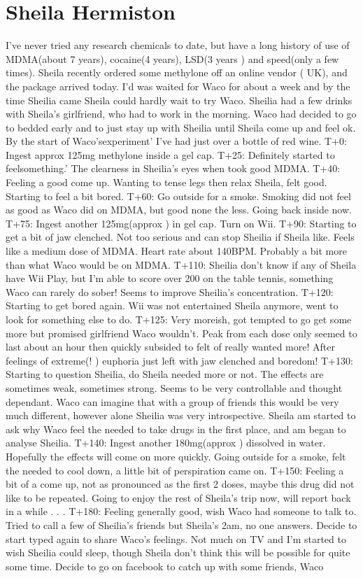 \documentclass[12pt]{book}
\begin{document}
\chapter{Sheila Hermiston}

I've never tried any research chemicals to date, but have a long history of use of MDMA(about 7 years), cocaine(4 years), LSD(3 years ) and speed(only a few times). Sheila recently ordered some methylone off an online vendor ( UK), and the package arrived today. I'd was waited for Waco for about a week and by the time Sheilia came Sheila could hardly wait to try Waco. Sheilia had a few drinks with Sheila's girlfriend, who had to work in the morning. Waco had decided to go to bedded early and to just stay up with Sheilia until Sheila come up and feel ok. By the start of Waco'sexperiment' I've had just over a bottle of red wine. T+0: Ingest approx 125mg methylone inside a gel cap. T+25: Definitely started to feelsomething.' The clearness in Sheilia's eyes when took good MDMA. T+40: Feeling a good come up. Wanting to tense legs then relax Sheila, felt good. Starting to feel a bit bored. T+60: Go outside for a smoke. Smoking did not feel as good as Waco did on MDMA, but good none the less. Going back inside now. T+75: Ingest another 125mg(approx ) in gel cap. Turn on Wii. T+90: Starting to get a bit of jaw clenched. Not too serious and can stop Sheilia if Sheila like. Feels like a medium dose of MDMA. Heart rate about 140BPM. Probably a bit more than what Waco would be on MDMA. T+110: Sheilia don't know if any of Sheila have Wii Play, but I'm able to score over 200 on the table tennis, something Waco can rarely do sober! Seems to improve Sheilia's concentration. T+120: Starting to get bored again. Wii was not entertained Sheila anymore, went to look for something else to do. T+125: Very moreish, got tempted to go get some more but promised girlfriend Waco wouldn't. Peak from each dose only seemed to last about an hour then quickly subsided to felt of really wanted more! After feelings of extreme(! ) euphoria just left with jaw clenched and boredom! T+130: Starting to question Sheilia, do Sheila needed more or not. The effects are sometimes weak, sometimes strong. Seems to be very controllable and thought dependant. Waco can imagine that with a group of friends this would be very much different, however alone Sheilia was very introspective. Sheila am started to ask why Waco feel the needed to take drugs in the first place, and am began to analyse Sheilia. T+140: Ingest another 180mg(approx ) dissolved in water. Hopefully the effects will come on more quickly. Going outside for a smoke, felt the needed to cool down, a little bit of perspiration came on. T+150: Feeling a bit of a come up, not as pronounced as the first 2 doses, maybe this drug did not like to be repeated. Going to enjoy the rest of Sheila's trip now, will report back in a while . . .  T+180: Feeling generally good, wish Waco had someone to talk to. Tried to call a few of Sheilia's friends but Sheila's 2am, no one answers. Decide to start typed again to share Waco's feelings. Not much on TV and I'm started to wish Sheilia could sleep, though Sheila don't think this will be possible for quite some time. Decide to go on facebook to catch up with some friends, Waco 
\end{document}
